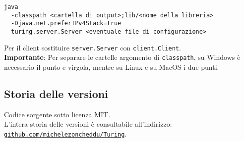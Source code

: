\begin{verbatim}
java
  -classpath <cartella di output>;lib/<nome della libreria>
  -Djava.net.preferIPv4Stack=true
  turing.server.Server <eventuale file di configurazione>
\end{verbatim}
Per il client sostituire \texttt{server.Server} con \texttt{client.Client}.
\medskip \\
\textbf{Importante}: Per separare le cartelle argomento di \texttt{classpath}, su Windows è necessario il punto e virgola, mentre su Linux e su MacOS i due punti.

\subsection{Storia delle versioni}
Codice sorgente sotto licenza MIT. \\
L'intera storia delle versioni è consultabile all'indirizzo: \\
\href{https://github.com/michelezoncheddu/Turing}{\texttt{github.com/michelezoncheddu/Turing}}.
